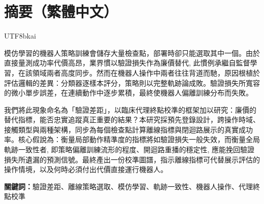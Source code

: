 \section*{摘要（繁體中文）}

\begin{CJK}{UTF8}{bkai}

模仿學習的機器人策略訓練會儲存大量檢查點，部署時卻只能選取其中一個。由於直接量測成功率代價高昂，業界慣以驗證損失作為廉價替代, 此慣例承繼自監督學習，在該領域兩者高度同步。然而在機器人操作中兩者往往背道而馳，原因根植於評估邏輯的差異：分類器逐樣本評分，策略則以完整軌跡論成敗。驗證損失所寬容的微小單步誤差，在連續動作中逐步累積，最終使機器人偏離訓練分布而失敗。

我們將此現象命名為「驗證差距」，以臨床代理終點校準的框架加以研究：廉價的替代指標，能否忠實追蹤真正重要的結果？本研究採預先登錄設計，跨操作時域、接觸類型與兩種架構，同步為每個檢查點計算離線指標與閉迴路展示的真實成功率。核心假說為：衡量局部動作精準度的指標將如驗證損失一般失效，而衡量全局軌跡一致性者, 即策略偏離訓練流形的程度、開迴路重播的穩定性, 應能挽回驗證損失所遺漏的預測信號。最終產出一份校準圖譜，指示離線指標可代替展示評估的操作情境，以及何時必須付出代價直接運行機器人。

\medskip
\noindent\textbf{關鍵詞：}驗證差距、離線策略選取、模仿學習、軌跡一致性、機器人操作、代理終點校準

\end{CJK}
